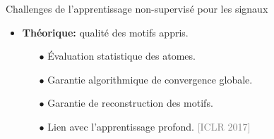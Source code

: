\documentclass{beamer}
\def\keypoint#1{\hspace{0pt plus 1 filll}\textcolor{gray}{[{\color{linkcolor}#1}]}~}
\begin{document}
\begin{frame}{Challenges de l'apprentissage non-supervisé pour les signaux}
\begin{itemize}
    \item \textbf{Théorique:} qualité des motifs appris.
    \begin{itemize}\itemsep.5em
        \item[$\bullet$] Évaluation statistique des atomes.
        \item[$\bullet$] Garantie algorithmique de convergence globale.
        \item[$\bullet$] Garantie de reconstruction des motifs.
        \item[$\bullet$] Lien avec l'apprentissage profond.%
                         \keypoint{ICLR 2017}
    \end{itemize}
\end{itemize}


\end{frame}
\end{document}
